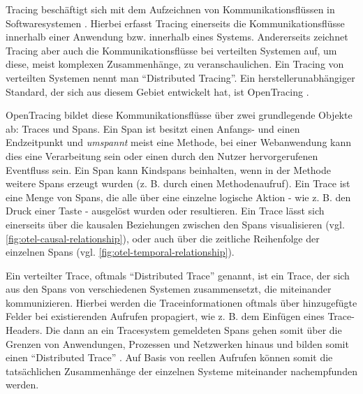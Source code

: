 Tracing beschäftigt sich mit dem Aufzeichnen von Kommunikationsflüssen in Softwaresystemen \cite{TowardsPerformanceToolingInteroperability}. Hierbei erfasst Tracing einerseits die Kommunikationsflüsse innerhalb einer Anwendung bzw. innerhalb eines Systems. Andererseits zeichnet Tracing aber auch die Kommunikationsflüsse bei verteilten Systemen auf, um diese, meist komplexen Zusammenhänge, zu veranschaulichen. Ein Tracing von verteilten Systemen nennt man \enquote{Distributed Tracing}. Ein herstellerunabhängiger Standard, der sich aus diesem Gebiet entwickelt hat, ist OpenTracing \cite{OpenTracing}.

OpenTracing bildet diese Kommunikationsflüsse über zwei grundlegende Objekte ab: Traces und Spans. Ein Span ist besitzt einen Anfangs- und einen Endzeitpunkt und \textit{umspannt} meist eine Methode, bei einer Webanwendung kann dies eine Verarbeitung sein oder einen durch den Nutzer hervorgerufenen Eventfluss sein. Ein Span kann Kindspans beinhalten, wenn in der Methode weitere Spans erzeugt wurden (z. B. durch einen Methodenaufruf). Ein Trace ist eine Menge von Spans, die alle über eine einzelne logische Aktion - wie z. B. den Druck einer Taste - ausgelöst wurden oder resultieren. Ein Trace lässt sich einerseits über die kausalen Beziehungen zwischen den Spans visualisieren (vgl. \autoref{fig:otel-causal-relationship}), oder auch über die zeitliche Reihenfolge der einzelnen Spans (vgl. \autoref{fig:otel-temporal-relationship}).

Ein verteilter Trace, oftmals \enquote{Distributed Trace} genannt, ist ein Trace, der sich aus den Spans von verschiedenen Systemen zusammensetzt, die miteinander kommunizieren. Hierbei werden die Traceinformationen oftmals über hinzugefügte Felder bei existierenden Aufrufen propagiert, wie z. B. dem Einfügen eines Trace-Headers. Die dann an ein Tracesystem gemeldeten Spans gehen somit über die Grenzen von Anwendungen, Prozessen und Netzwerken hinaus und bilden somit einen \enquote{Distributed Trace} \cite{OpenTracingSpecification}. Auf Basis von reellen Aufrufen können somit die tatsächlichen Zusammenhänge der einzelnen Systeme miteinander nachempfunden werden.

